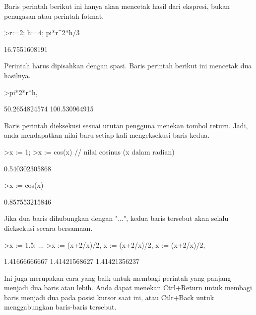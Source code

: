 \documentclass[a4paper,10pt]{article}
\begin{document}
\begin{eulernotebook}
\begin{eulercomment}
Baris perintah berikut ini hanya akan mencetak hasil dari ekspresi,
bukan penugasan atau perintah fotmat.
\end{eulercomment}
\begin{eulerprompt}
>r:=2; h:=4; pi*r^2*h/3
\end{eulerprompt}
\begin{euleroutput}
  16.7551608191
\end{euleroutput}
\begin{eulercomment}
Perintah harus dipisahkan dengan spasi. Baris perintah berikut ini
mencetak dua hasilnya.
\end{eulercomment}
\begin{eulerprompt}
>pi*2*r*h, %
\end{eulerprompt}
\begin{euleroutput}
  50.2654824574
  100.530964915
\end{euleroutput}
\begin{eulercomment}
Baris perintah dieksekusi sesuai urutan pengguna menekan tombol
return. Jadi, anda mendapatkan nilai baru setiap kali mengeksekusi
baris kedua.
\end{eulercomment}
\begin{eulerprompt}
>x := 1;
>x := cos(x) // nilai cosinus (x dalam radian)
\end{eulerprompt}
\begin{euleroutput}
  0.540302305868
\end{euleroutput}
\begin{eulerprompt}
>x := cos(x)
\end{eulerprompt}
\begin{euleroutput}
  0.857553215846
\end{euleroutput}
\begin{eulercomment}
Jika dua baris dihubungkan dengan "...", kedua baris tersebut akan
selalu dieksekusi secara bersamaan.
\end{eulercomment}
\begin{eulerprompt}
>x := 1.5; ...
>x := (x+2/x)/2, x := (x+2/x)/2, x := (x+2/x)/2, 
\end{eulerprompt}
\begin{euleroutput}
  1.41666666667
  1.41421568627
  1.41421356237
\end{euleroutput}
\begin{eulercomment}
Ini juga merupakan cara yang baik untuk membagi perintah yang panjang
menjadi dua baris atau lebih. Anda dapat menekan Ctrl+Return untuk
membagi baris menjadi dua pada posisi kursor saat ini, atau Ctlr+Back
untuk menggabungkan baris-baris tersebut.


\end{eulercomment}
\end{eulernotebook}
\end{document}
